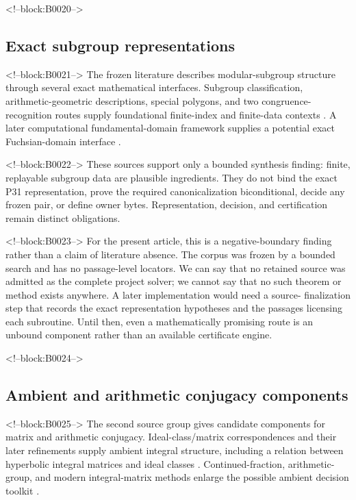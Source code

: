 \documentclass[11pt]{article}
\begin{document}
<!--block:B0020-->
\hypertarget{21-exact-subgroup-representations}{%
\subsection{Exact subgroup
representations}\label{21-exact-subgroup-representations}}

<!--block:B0021-->
The frozen literature describes modular-subgroup structure through
several exact mathematical interfaces.
Subgroup classification, arithmetic-geometric descriptions, special
polygons, and two congruence-recognition routes supply foundational
finite-index and finite-data contexts
\citep{P31-S01,P31-S02,P31-S03,P31-S04,P31-S05}.
A later computational fundamental-domain framework supplies a potential
exact Fuchsian-domain interface
\citep{P31-S06}.

<!--block:B0022-->
These sources support only a bounded synthesis finding: finite,
replayable subgroup data are plausible ingredients. They do not bind the
exact P31 representation, prove the required canonicalization
biconditional, decide any frozen pair, or define owner bytes.
Representation, decision, and certification remain distinct obligations.

<!--block:B0023-->
For the present article, this is a negative-boundary finding rather than a claim of
literature absence. The corpus was frozen by a bounded search and has no
passage-level locators. We can say that no retained source was admitted
as the complete project solver; we cannot say that no such theorem or
method exists anywhere. A later implementation would need a source-
finalization step that records the exact representation hypotheses and
the passages licensing each subroutine. Until then, even a mathematically
promising route is an unbound component rather than an available
certificate engine.

<!--block:B0024-->
\hypertarget{22-ambient-and-arithmetic-conjugacy-components}{%
\subsection{Ambient and arithmetic conjugacy
components}\label{22-ambient-and-arithmetic-conjugacy-components}}

<!--block:B0025-->
The second source group gives candidate components for matrix and
arithmetic conjugacy. Ideal-class/matrix correspondences and their later
refinements supply ambient integral structure, including a relation
between hyperbolic integral matrices and ideal classes
\citep{P31-S07,P31-S08,P31-S09}.
Continued-fraction, arithmetic-group, and modern integral-matrix methods
enlarge the possible ambient decision toolkit
\citep{P31-S10,P31-S11,P31-S12,P31-S13}.
\end{document}
